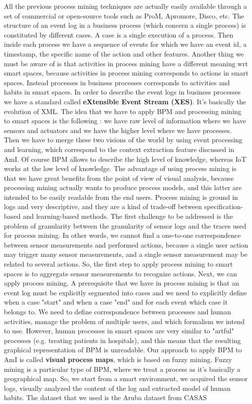 \documentclass[11pt]{article}
\begin{document}
All the previous process mining techniques are actually easily available through a set of commercial or open-source tools such as ProM, Apromore, Disco, etc. The structure of an event log in a business process (which concern a single process) is constituted by different cases. A case is a single execution of a process. Then inside each process we have a sequence of events for which we have an event id, a timestamp, the specific name of the action and other features. Another thing we must be aware of is that activities in process mining have a different meaning wrt smart spaces, because activities in process mining corresponds to actions in smart spaces. Instead processes in business processes corresponds to activities and habits in smart spaces. In order to describe the event logs in business processes we have a standard called \textbf{eXtensible Event Stream (XES)}. It's basically the evolution of XML. The idea that we have to apply BPM and processing mining to smart spaces is the following : we have raw level of information where we have sensors and actuators and we have the higher level where we have processes. Then we have to merge these two visions of the world by using event processing and learning, which correspond to the context extraction feature discussed in AmI. Of course BPM allows to describe the high level of knowledge, whereas IoT works at the low level of knowledge. The advantage of using process mining is that we have great benefits from the point of view of visual analysis, because processing mining actually wants to produce process models, and this latter are intended to be easily readable from the end users. Process mining is ground in logs and very descriptive, and they are a kind of trade-off between specification-based and learning-based methods. The first challenge to be addressed is the problem of granularity between the granularity of sensor logs and the traces used for process mining. In other words, we cannot find a one-to-one correspondence between sensor measurements and performed actions, because a single user action may trigger many sensor measurements, and a single sensor measurement may be related to several actions. So, the first step to apply process mining to smart spaces is to aggregate sensor measurements to recognize actions. Next, we can apply process mining. A prerequisite that we have in process mining is that an event log must be explicitly segmented into cases and we need to explicitly define when a case "start" and when a case "end" and for each event which case it belongs to. We need to define correspondence between processes and human activities, manage the problem of multiple users, and which formalism we intend to use. However, human processes in smart spaces are very similar to "artful" processes (e.g. treating patients in hospitals), and this means that the resulting graphical representation of BPM is unreadable. Our approach to apply BPM to AmI is called \textbf{visual process maps}, which is based on fuzzy mining. Fuzzy mining is a particular type of BPM, where we treat a process as it's basically a geographical map. So, we start from a smart environment, we acquired the sensor logs, visually analyzed the content of the log and extracted model of human habits. The dataset that we used is the Aruba dataset from CASAS 
\end{document}
